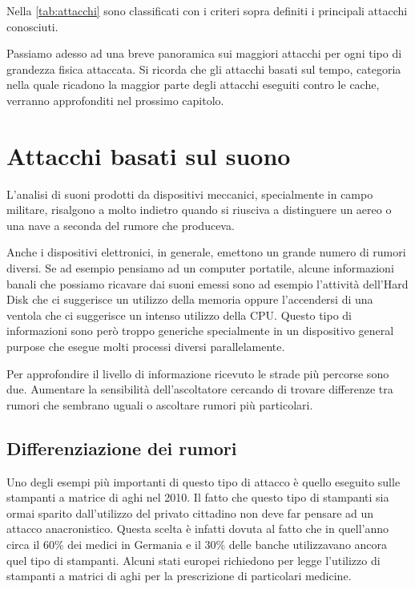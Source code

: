 			Nella \cref{tab:attacchi} sono classificati con i criteri sopra definiti i principali attacchi conosciuti.
			
			Passiamo adesso ad una breve panoramica sui maggiori attacchi per ogni tipo di grandezza fisica attaccata. Si ricorda che gli attacchi basati sul tempo, categoria nella quale ricadono la maggior parte degli attacchi eseguiti contro le cache, verranno approfonditi nel prossimo capitolo.
			
	\section{Attacchi basati sul suono}
	L'analisi di suoni prodotti da dispositivi meccanici, specialmente in campo militare, risalgono a molto indietro quando si riusciva a distinguere un aereo o una nave a seconda del rumore che produceva.
	
	Anche i dispositivi elettronici, in generale, emettono un grande numero di rumori diversi. Se ad esempio pensiamo ad un computer portatile, alcune informazioni banali che possiamo ricavare dai suoni emessi sono ad esempio l'attività dell'Hard Disk che ci suggerisce un utilizzo della memoria oppure l'accendersi di una ventola che ci suggerisce un intenso utilizzo della CPU. Questo tipo di informazioni sono però troppo generiche specialmente in un dispositivo general purpose che esegue molti processi diversi parallelamente.
	
	Per approfondire il livello di informazione ricevuto le strade più percorse sono due. Aumentare la sensibilità dell'ascoltatore cercando di trovare differenze tra rumori che sembrano uguali o ascoltare rumori più particolari.
	
	\subsection{Differenziazione dei rumori}	
		Uno degli esempi più importanti di questo tipo di attacco è quello eseguito sulle stampanti a matrice di aghi nel 2010\cite{backes2010acoustic}. Il fatto che questo tipo di stampanti sia ormai sparito dall'utilizzo del privato cittadino non deve far pensare ad un attacco anacronistico. Questa scelta è infatti dovuta al fatto che in quell'anno circa il $60\%$ dei medici in Germania e il $30\%$ delle banche utilizzavano ancora quel tipo di stampanti. Alcuni stati europei richiedono per legge l'utilizzo di stampanti a matrici di aghi per la prescrizione di particolari medicine\cite{bernatzky2011schmerzbehandlung}.
		
